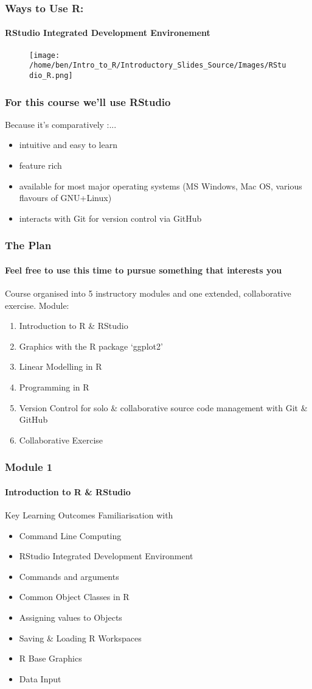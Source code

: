 \documentclass[xcolor=dvipsnames]{beamer}
\begin{document}
\begin{frame}
\frametitle{Ways to Use R:}
\framesubtitle{RStudio Integrated Development Environement}
\begin{figure}
\texttt{[image: /home/ben/Intro\_to\_R/Introductory\_Slides\_Source/Images/RStudio\_R.png]}
\end{figure}
\end{frame}

\begin{frame}
\frametitle{For this course we'll use RStudio}
Because it's comparatively :...
\begin{itemize}
\item intuitive and easy to learn
\item feature rich
\item available for most major operating systems (MS Windows, Mac OS, various flavours of GNU+Linux)
\item interacts with Git for version control via GitHub
\end{itemize}

\end{frame}

\begin{frame}
\frametitle{The Plan}
\framesubtitle{Feel free to use this time to pursue something that interests you}
Course organised into 5 instructory modules and one extended, collaborative exercise.
\newline
\newline
Module: \begin{enumerate}
\item Introduction to R \& RStudio  
\item Graphics with the R package `ggplot2'
\item Linear Modelling in R
\item Programming in R
\item Version Control for solo \& collaborative source code management with Git \& GitHub
\item Collaborative Exercise
\end{enumerate}

\end{frame}

\begin{frame}
\frametitle{Module 1}
\framesubtitle{Introduction to R \& RStudio}
\begin{block}{Key Learning Outcomes}
Familiarisation with \begin{itemize}
\item Command Line Computing
\item RStudio Integrated Development Environment
\item Commands and arguments
\item Common Object Classes in R
\item Assigning values to Objects
\item Saving \& Loading R Workspaces
\item R Base Graphics
\item Data Input
\end{itemize}
\end{block}
\end{frame}
\end{document}
